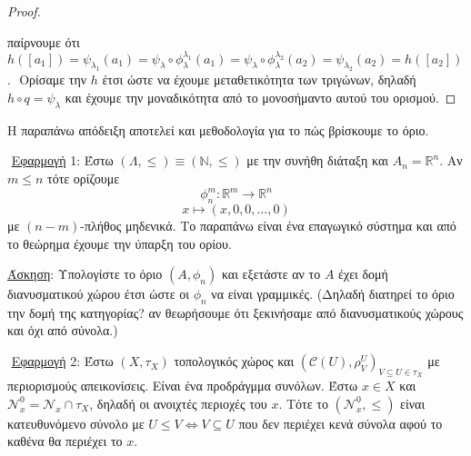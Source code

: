 \begin{proof}
    \begin{figure}[H]
        \centering
    \end{figure}
    
    
    \noindent παίρνουμε ότι $h([a_1]) = \psi_{\lambda_1}(a_1) = \psi_{\lambda} \circ \phi^{\lambda_1}_{\lambda} (a_1) = \psi_{\lambda} \circ \phi^{\lambda_2}_{\lambda}(a_2) = \psi_{\lambda_2} (a_2) = h([a_2])$.
    $ $\newline
    Ορίσαμε την $h$ έτσι ώστε να έχουμε μεταθετικότητα των τριγώνων, δηλαδή $h\circ q = \psi_{\lambda}$ και έχουμε την μοναδικότητα από το μονοσήμαντο αυτού του ορισμού.
\end{proof}

\begin{remark} Η παραπάνω απόδειξη αποτελεί και μεθοδολογία για το πώς βρίσκουμε το όριο.
\end{remark}

$ $\newline
\underline{Εφαρμογή} 1: Έστω $(\Lambda,\leq) \equiv (\mathbb{N},\leq)$ με την συνήθη διάταξη και $A_n = \mathbb{R}^n$. Αν $m\leq n$ τότε ορίζουμε 
$$\phi^{m}_n : \mathbb{R}^m \rightarrow \mathbb{R}^n$$
$$x\longmapsto (x,0,0,\ldots,0)$$ με $(n-m)$-πλήθος μηδενικά. Το παραπάνω είναι ένα επαγωγικό σύστημα και από το θεώρημα έχουμε την ύπαρξη του ορίου.

\underline{Άσκηση}: Υπολογίστε το όριο $(A,\phi_n)$ και εξετάστε αν το $A$ έχει δομή διανυσματικού χώρου έτσι ώστε οι $\phi_n$ να είναι γραμμικές. (Δηλαδή διατηρεί το όριο την δομή της κατηγορίας? αν θεωρήσουμε ότι ξεκινήσαμε από διανυσματικούς χώρους και όχι από σύνολα.)


$ $\newline
\underline{Εφαρμογή} 2: Έστω $(X,\tau_X)$ τοπολογικός χώρος και $(\mathcal{C}(U),\rho^U_V)_{V\subseteq U \in \tau_X}$ με περιορισμούς απεικονίσεις. Είναι ένα προδράγμμα συνόλων. Έστω $x \in X$ και $\mathcal{N}^0_x = \mathcal{N}_x \cap \tau_X$, δηλαδή οι ανοιχτές περιοχές του $x$. Τότε το $(\mathcal{N}^0_x,\leq)$ είναι κατευθυνόμενο σύνολο με $U\leq V \iff V\subseteq U$ που δεν περιέχει κενά σύνολα αφού το καθένα θα περιέχει το $x$.

